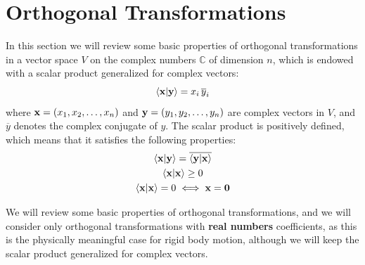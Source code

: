 \documentclass[12pt]{article}
\begin{document}
\section{Orthogonal Transformations}

In this section we will review some basic properties of orthogonal transformations in a
vector space $V$ on the complex numbers $\mathbb{C}$ of dimension $n$, which is endowed with
a scalar product generalized for complex vectors:
\begin{equation}
  \ip{\vb{x}}{\vb{y}} = x_i\,\overline{y}_i
\end{equation}
where $\vb{x} = (x_1, x_2, \ldots, x_n)$ and $\vb{y} = (y_1, y_2, \ldots, y_n)$ are complex
vectors in $V$, and $\overline{y}$ denotes the complex conjugate of $y$. The scalar product
is positively defined, which means that it satisfies the following properties:
\begin{equation}
  \begin{gathered}
    \ip{\vb{x}}{\vb{y}} = \overline{\ip{\vb{y}}{\vb{x}}} \\
    \ip{\vb{x}}{\vb{x}} \geq 0 \\
    \ip{\vb{x}}{\vb{x}} = 0 \iff \vb{x} = \vb{0}
  \end{gathered}
\end{equation}

We will review some basic properties of orthogonal transformations, and we will consider only
orthogonal transformations with \textbf{real numbers} coefficients, as this is the physically
meaningful case for rigid body motion, although we will keep the scalar product generalized
for complex vectors.
\end{document}
